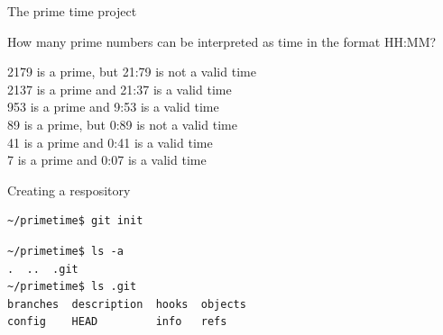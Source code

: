 \documentclass[svgnames]{beamer}
\begin{document}
\begin{frame}{The prime time project}
 \textit{}

 How many prime numbers can be interpreted as time in the format HH:MM?

 \vspace{1\baselineskip}
 \textit{}

 \textcolor{wrong}{2179 is a prime, but 21:79 is not a valid time}\\
 \textcolor{right}{2137 is a prime and 21:37 is a valid time}\\
 \textcolor{right}{953 is a prime and 9:53 is a valid time}\\
 \textcolor{wrong}{89 is a prime, but 0:89 is not a valid time}\\
 \textcolor{right}{41 is a prime and 0:41 is a valid time}\\
 \textcolor{right}{7 is a prime and 0:07 is a valid time}

 \vspace{1.5\baselineskip}
 \begin{center}
 \end{center}
\end{frame}

\begin{frame}[fragile]{Creating a respository}

 \begin{lstlisting}
~/primetime$ git init
 \end{lstlisting}

 \vspace{\baselineskip}
 \begin{lstlisting}
~/primetime$ ls -a
.  ..  .git
~/primetime$ ls .git
branches  description  hooks  objects
config    HEAD         info   refs
 \end{lstlisting}

 \begin{center}
 \end{center}
\end{frame}
\end{document}
